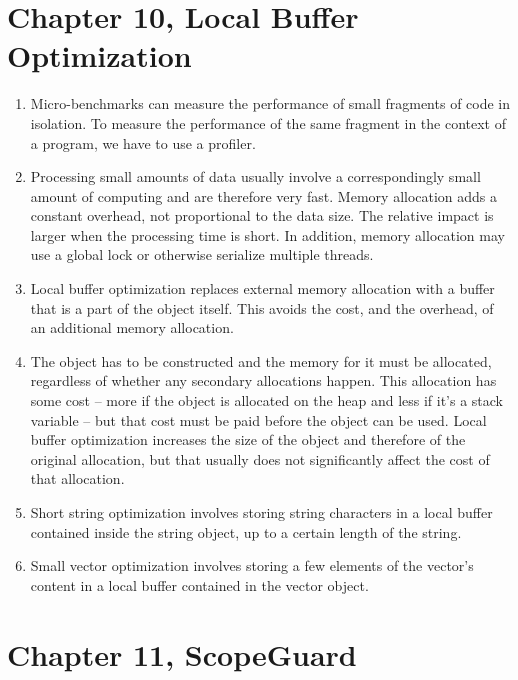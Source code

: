 \section{Chapter 10, Local Buffer Optimization}

\begin{enumerate}
\item
  Micro-benchmarks can measure the performance of small fragments of code in isolation. To measure the performance of the same fragment in the context of a program, we have to use a profiler.
\item
  Processing small amounts of data usually involve a correspondingly small amount of computing and are therefore very fast. Memory allocation adds a constant overhead, not proportional to the data size. The relative impact is larger when the processing time is short. In addition, memory allocation may use a global lock or otherwise serialize multiple threads.
\item
  Local buffer optimization replaces external memory allocation with a buffer that is a part of the object itself. This avoids the cost, and the overhead, of an additional memory allocation.
\item
  The object has to be constructed and the memory for it must be allocated, regardless of whether any secondary allocations happen. This allocation has some cost -- more if the object is allocated on the heap and less if it's a stack variable -- but that cost must be paid before the object can be used. Local buffer optimization increases the size of the object and therefore of the original allocation, but that usually does not significantly affect the cost of that allocation.
\item
  Short string optimization involves storing string characters in a local buffer contained inside the string object, up to a certain length of the string.
\item
  Small vector optimization involves storing a few elements of the vector's content in a local buffer contained in the vector object.
\end{enumerate}

\section{Chapter 11, ScopeGuard}

